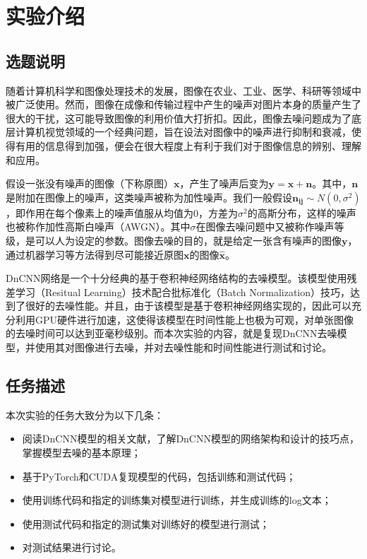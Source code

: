 
\chapter{实验介绍}

\section{选题说明}

随着计算机科学和图像处理技术的发展，图像在农业、工业、医学、科研等领域中被广泛使用。然而，图像在成像和传输过程中产生的噪声对图片本身的质量产生了很大的干扰，这可能导致图像的利用价值大打折扣。因此，图像去噪问题成为了底层计算机视觉领域的一个经典问题，旨在设法对图像中的噪声进行抑制和衰减，使得有用的信息得到加强，便会在很大程度上有利于我们对于图像信息的辨别、理解和应用。

假设一张没有噪声的图像（下称原图）$ \boldsymbol{x} $，产生了噪声后变为$ \boldsymbol{y} = \boldsymbol{x} + \boldsymbol{n} $。其中，$ \boldsymbol{n} $是附加在图像上的噪声，这类噪声被称为加性噪声。我们一般假设$ \boldsymbol{n_{ij}} \sim N(0, \sigma^2) $，即作用在每个像素上的噪声值服从均值为0，方差为$ \sigma^2 $的高斯分布，这样的噪声也被称作加性高斯白噪声（AWGN）。其中$ \sigma $在图像去噪问题中又被称作噪声等级，是可以人为设定的参数。图像去噪的目的，就是给定一张含有噪声的图像$ \boldsymbol{y} $，通过机器学习等方法得到尽可能接近原图$ \boldsymbol{x} $的图像$ \boldsymbol{\hat{x}} $。

DnCNN网络是一个十分经典的基于卷积神经网络结构的去噪模型。该模型使用残差学习（Resitual Learning）技术配合批标准化（Batch Normalization）技巧，达到了很好的去噪性能。并且，由于该模型是基于卷积神经网络实现的，因此可以充分利用GPU硬件进行加速，这使得该模型在时间性能上也极为可观，对单张图像的去噪时间可以达到亚毫秒级别。而本次实验的内容，就是复现DnCNN去噪模型，并使用其对图像进行去噪，并对去噪性能和时间性能进行测试和讨论。

\section{任务描述}

本次实验的任务大致分为以下几条：
\begin{itemize}
	\item 阅读DnCNN模型的相关文献，了解DnCNN模型的网络架构和设计的技巧点，掌握模型去噪的基本原理；
	\item 基于PyTorch和CUDA复现模型的代码，包括训练和测试代码；
	\item 使用训练代码和指定的训练集对模型进行训练，并生成训练的log文本；
	\item 使用测试代码和指定的测试集对训练好的模型进行测试；
	\item 对测试结果进行讨论。
\end{itemize}

